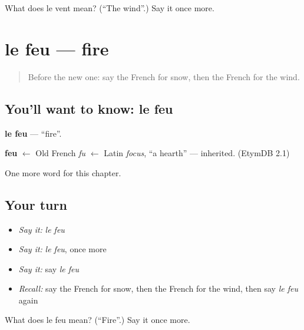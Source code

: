 \begin{tcolorbox}[breakable,colback=teal!4,colframe=teal!35!black,title={Before you move on}]
What does le vent mean? (\textquotedblleft{}The wind\textquotedblright{}.) Say it once more.
\end{tcolorbox}
\section[le feu]{le feu — fire}

\label{lesson:FR-C84-feu}



\begin{quote}
Before the new one: say the French for snow, then the French for the wind.
\end{quote}

\subsection*{You'll want to know: le feu}
\textbf{le feu} — \textquotedblleft{}fire\textquotedblright{}.

\begin{cousinweb}
\textbf{feu} $\leftarrow$ Old French \emph{fu} $\leftarrow$ Latin \emph{focus}, \textquotedblleft{}a hearth\textquotedblright{} — inherited. (EtymDB 2.1)
\end{cousinweb}

\begin{grammarlens}[title={What you've built}]
One more word for this chapter.
\end{grammarlens}

\subsection*{Your turn}
\begin{itemize}
\raggedright
  \item \emph{Say it:} \emph{le feu}
  \item \emph{Say it:} \emph{le feu}, once more
  \item \emph{Say it:} say \emph{le feu}
  \item \emph{Recall:} say the French for snow, then the French for the wind, then say \emph{le feu} again
\end{itemize}

\begin{tcolorbox}[breakable,colback=teal!4,colframe=teal!35!black,title={Before you move on}]
What does le feu mean? (\textquotedblleft{}Fire\textquotedblright{}.) Say it once more.
\end{tcolorbox}
